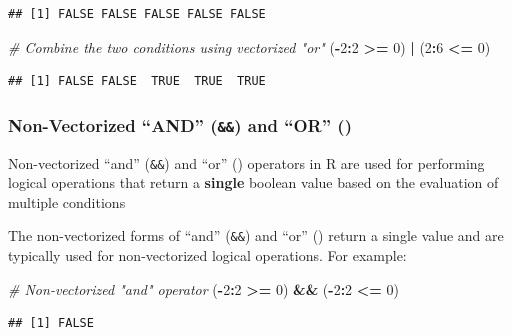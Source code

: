 \documentclass[
]{book}
\newenvironment{Shaded}{\begin{snugshade}}{\end{snugshade}}
\newcommand{\CommentTok}[1]{\textcolor[rgb]{0.56,0.35,0.01}{\textit{#1}}}
\newcommand{\DecValTok}[1]{\textcolor[rgb]{0.00,0.00,0.81}{#1}}
\newcommand{\NormalTok}[1]{#1}
\newcommand{\SpecialCharTok}[1]{\textcolor[rgb]{0.81,0.36,0.00}{\textbf{#1}}}
\begin{document}
\begin{verbatim}
## [1] FALSE FALSE FALSE FALSE FALSE
\end{verbatim}

\begin{Shaded}
\begin{Highlighting}[]
\CommentTok{\# Combine the two conditions using vectorized "or"}
\NormalTok{(}\SpecialCharTok{{-}}\DecValTok{2}\SpecialCharTok{:}\DecValTok{2} \SpecialCharTok{\textgreater{}=} \DecValTok{0}\NormalTok{) }\SpecialCharTok{|}\NormalTok{ (}\DecValTok{2}\SpecialCharTok{:}\DecValTok{6} \SpecialCharTok{\textless{}=} \DecValTok{0}\NormalTok{)}
\end{Highlighting}
\end{Shaded}

\begin{verbatim}
## [1] FALSE FALSE  TRUE  TRUE  TRUE
\end{verbatim}

\hypertarget{non-vectorized-and-and-or}{%
\subsubsection{\texorpdfstring{Non-Vectorized ``AND'' (\texttt{\&\&}) and ``OR'' (\texttt{\textbar{}\textbar{}})}{Non-Vectorized ``AND'' (\&\&) and ``OR'' (\textbar\textbar)}}\label{non-vectorized-and-and-or}}

Non-vectorized ``and'' (\texttt{\&\&}) and ``or'' (\texttt{\textbar{}\textbar{}}) operators in R are used for performing logical operations that return a \textbf{single} boolean value based on the evaluation of multiple conditions

The non-vectorized forms of ``and'' (\texttt{\&\&}) and ``or'' (\texttt{\textbar{}\textbar{}}) return a single value and are typically used for non-vectorized logical operations. For example:

\begin{Shaded}
\begin{Highlighting}[]
\CommentTok{\# Non{-}vectorized "and" operator}
\NormalTok{(}\SpecialCharTok{{-}}\DecValTok{2}\SpecialCharTok{:}\DecValTok{2} \SpecialCharTok{\textgreater{}=} \DecValTok{0}\NormalTok{) }\SpecialCharTok{\&\&}\NormalTok{ (}\SpecialCharTok{{-}}\DecValTok{2}\SpecialCharTok{:}\DecValTok{2} \SpecialCharTok{\textless{}=} \DecValTok{0}\NormalTok{)}
\end{Highlighting}
\end{Shaded}

\begin{verbatim}
## [1] FALSE
\end{verbatim}
\end{document}
